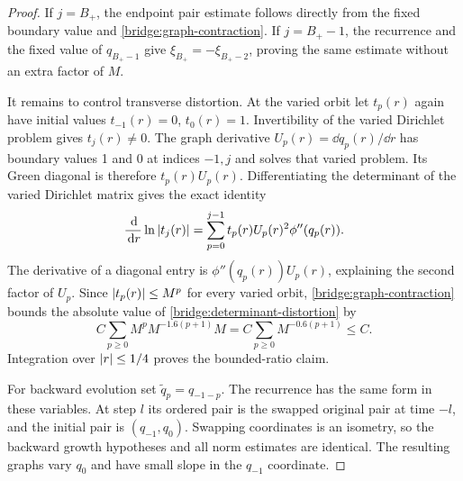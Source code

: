 \begin{proof}
If $j=B_+$, the endpoint pair estimate follows directly from the
fixed boundary value and \cref{bridge:graph-contraction}. If
$j=B_+-1$, the recurrence and the fixed value of $q_{B_+-1}$ give
$\xi_{B_+}=-\xi_{B_+-2}$, proving the same estimate without an extra
factor of $M$.

It remains to control transverse distortion. At the varied orbit let
$t_p(r)$ again have initial values $t_{-1}(r)=0$, $t_0(r)=1$.
Invertibility of the varied Dirichlet problem gives $t_j(r)\ne0$.
The graph derivative $U_p(r)=\dd q_p(r)/\dd r$ has boundary values
1 and 0 at indices $-1,j$ and solves that varied problem. Its Green
diagonal is therefore $t_p(r)U_p(r)$. Differentiating the determinant
of the varied Dirichlet matrix gives the exact identity
\begin{equation}
 \frac{\,\mathrm{d}}{\,\mathrm{d} r}\ln\left\lvert t_j(r)\right\rvert
 =\sum_{p=0}^{j-1}t_p(r)U_p(r)^2\phi''(q_p(r)).
 \label{bridge:determinant-distortion}
\end{equation}
The derivative of a diagonal entry is
$\phi''(q_p(r))U_p(r)$, explaining the second factor of $U_p$.
Since $\left\lvert t_p(r)\right\rvert\leq M^p$ for every varied orbit,
\cref{bridge:graph-contraction} bounds the absolute value of
\cref{bridge:determinant-distortion} by
\[
 C\sum_{p\geq0}M^p M^{-1.6(p+1)}M
 =C\sum_{p\geq0}M^{-0.6(p+1)}\leq C.
\]
Integration over $\left\lvert r\right\rvert\leq1/4$ proves the bounded-ratio claim.

For backward evolution set $\widetilde q_p=q_{-1-p}$. The recurrence
has the same form in these variables. At step $l$ its ordered pair
is the swapped original pair at time $-l$, and the initial pair is
$(q_{-1},q_0)$. Swapping coordinates is an isometry, so the backward
growth hypotheses and all norm estimates are identical. The resulting
graphs vary $q_0$ and have small slope in the $q_{-1}$ coordinate.
\end{proof}

